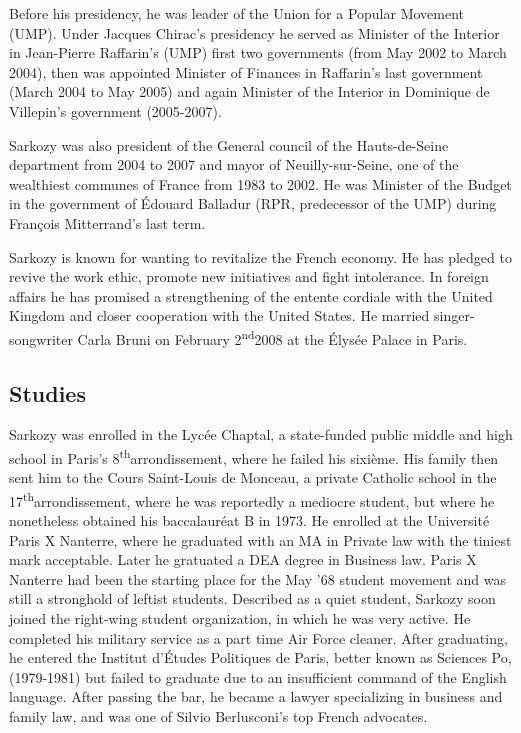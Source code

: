 \documentclass[11pt;a4paper]{article}
\newcommand{\theu}[0]{\textsuperscript{th}}
\newcommand{\nd}[0]{\textsuperscript{nd}}
\begin{document}
Before his presidency, he was leader of the Union for a Popular Movement (UMP). Under Jacques Chirac's presidency he served as Minister of the Interior in Jean-Pierre Raffarin's (UMP) first two governments (from May 2002 to March 2004), then was appointed Minister of Finances in Raffarin's last government (March 2004 to May 2005) and again Minister of the Interior in Dominique de Villepin's government (2005-2007).

Sarkozy was also president of the General council of the Hauts-de-Seine department from 2004 to 2007 and mayor of Neuilly-sur-Seine, one of the wealthiest communes of France from 1983 to 2002. He was Minister of the Budget in the government of Édouard Balladur (RPR, predecessor of the UMP) during François Mitterrand's last term.

Sarkozy is known for wanting to revitalize the French economy. He has pledged to revive the work ethic, promote new initiatives and fight intolerance. In foreign affairs he has promised a strengthening of the entente cordiale with the United Kingdom and closer cooperation with the United States. He married singer-songwriter Carla Bruni on February 2\nd 2008 at the Élysée Palace in Paris.

\subsection*{Studies}

Sarkozy was enrolled in the Lycée Chaptal, a state-funded public middle and high school in Paris's 8\theu arrondissement, where he failed his sixième. His family then sent him to the Cours Saint-Louis de Monceau, a private Catholic school in the 17\theu arrondissement, where he was reportedly a mediocre student, but where he nonetheless obtained his baccalauréat B in 1973. He enrolled at the Université Paris X Nanterre, where he graduated with an MA in Private law with the tiniest mark acceptable. Later he gratuated a DEA degree in Business law. Paris X Nanterre had been the starting place for the May '68 student movement and was still a stronghold of leftist students. Described as a quiet student, Sarkozy soon joined the right-wing student organization, in which he was very active. He completed his military service as a part time Air Force cleaner. After graduating, he entered the Institut d'Études Politiques de Paris, better known as Sciences Po, (1979-1981) but failed to graduate due to an insufficient command of the English language. After passing the bar, he became a lawyer specializing in business and family law, and was one of Silvio Berlusconi's top French advocates.
\end{document}

